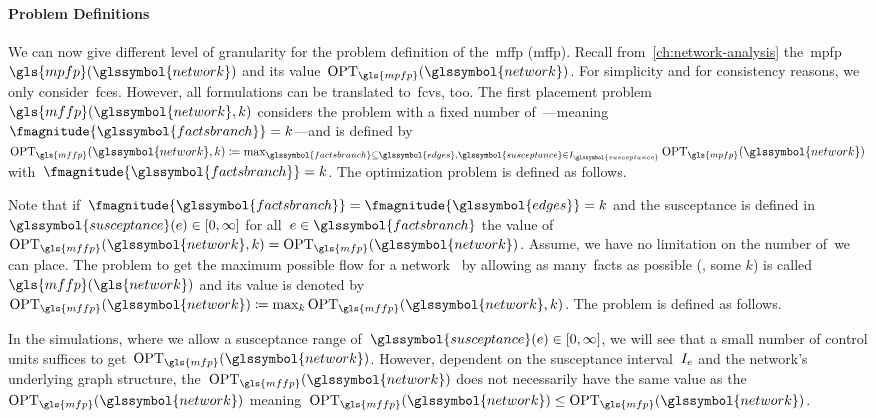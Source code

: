 \paragraph{Problem Definitions}
\label{ch:facts:sec:complexity:problem-definition}
% 
We can now give different level of granularity for the problem definition of
the~\acrlong{mffp} (\gls{mffp}). Recall
from~\cref{ch:network-analysis} the~\acrlong{mpfp}~$\gls{mpfp}(
\glssymbol{network})$ and its value~$\opt_{\gls{mpfp}}(\glssymbol{network})$.
For simplicity and for consistency reasons, we only consider~\gls{fce}s.
However, all formulations can be translated to~\gls{fcv}s, too. The first
placement problem~$\gls{mffp}(\glssymbol{network},k)$ considers the problem with
a fixed number of~\facts---meaning~$\fmagnitude{\glssymbol{factsbranch}} =
k$---and is defined by~$\opt_{\gls{mffp}}(\glssymbol{network}, k) \coloneqq
\max_{\glssymbol{factsbranch}\subseteq\glssymbol{edges},\glssymbol{susceptance}\in
\interval_{\glssymbol{susceptance}}}\opt_{\gls{mpfp}}(\glssymbol{network})$
with~$\fmagnitude{\glssymbol{factsbranch}} = k$. The optimization problem is
defined as follows.
%
\begingroup
    
    \label{ch:facts:problems:maximum-facts-flow-with-k-facts-optimization-problem}
\endgroup
% 
Note that if~$\fmagnitude{\glssymbol{factsbranch}} =
\fmagnitude{\glssymbol{edges}} = k$ and the susceptance is defined
in~$\glssymbol{susceptance}(\edge)\in[0,\infty]$ for
all~$\edge\in\glssymbol{factsbranch}$ the value
of~$\opt_{\gls{mffp}}(\glssymbol{network},k) =
\opt_{\gls{mfp}} (\glssymbol{network})$. Assume, we have no limitation on the
number of~\facts we can place. The problem to get the maximum possible flow for
a network~ by allowing as many~\gls{facts} as possible (\ie,
some $k$) is called~$\gls{mffp}(\gls{network})$ and its value is denoted
by~$\opt_{
\gls{mffp}}(
\glssymbol{network})\coloneqq\max_{k}
\opt_{\gls{mffp}}(\glssymbol{network},k)$. The problem is defined as follows.
%
\begingroup
    
    \label{ch:facts:problems:maximum-facts-flow-optimization-problem}
\endgroup
% 
In the simulations, where we allow a susceptance range
of~$\glssymbol{susceptance} (\edge)\in[0,\infty]$, we will see that a small
number of control units suffices to get~$\opt_{\gls{mfp}}(\glssymbol{network})$.
However, dependent on the susceptance interval~$I_{e}$ and the
network's underlying graph structure,
the~$\opt_{\gls{mffp}}(\glssymbol{network})$ does not necessarily have the same
value as the~$\opt_{\gls{mfp}}(\glssymbol{network})$ meaning~$
\opt_{\gls{mffp}}(\glssymbol{network})
\leq
\opt_{\gls{mfp}}(\glssymbol{network})
$.%


